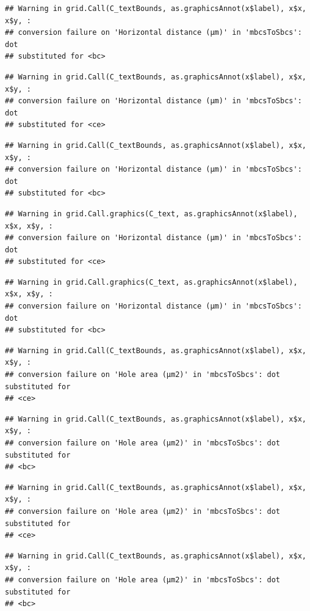 \documentclass[
]{article}
\begin{document}
\begin{verbatim}
## Warning in grid.Call(C_textBounds, as.graphicsAnnot(x$label), x$x, x$y, :
## conversion failure on 'Horizontal distance (μm)' in 'mbcsToSbcs': dot
## substituted for <bc>
\end{verbatim}

\begin{verbatim}
## Warning in grid.Call(C_textBounds, as.graphicsAnnot(x$label), x$x, x$y, :
## conversion failure on 'Horizontal distance (μm)' in 'mbcsToSbcs': dot
## substituted for <ce>
\end{verbatim}

\begin{verbatim}
## Warning in grid.Call(C_textBounds, as.graphicsAnnot(x$label), x$x, x$y, :
## conversion failure on 'Horizontal distance (μm)' in 'mbcsToSbcs': dot
## substituted for <bc>
\end{verbatim}

\begin{verbatim}
## Warning in grid.Call.graphics(C_text, as.graphicsAnnot(x$label), x$x, x$y, :
## conversion failure on 'Horizontal distance (μm)' in 'mbcsToSbcs': dot
## substituted for <ce>
\end{verbatim}

\begin{verbatim}
## Warning in grid.Call.graphics(C_text, as.graphicsAnnot(x$label), x$x, x$y, :
## conversion failure on 'Horizontal distance (μm)' in 'mbcsToSbcs': dot
## substituted for <bc>
\end{verbatim}

\begin{verbatim}
## Warning in grid.Call(C_textBounds, as.graphicsAnnot(x$label), x$x, x$y, :
## conversion failure on 'Hole area (μm2)' in 'mbcsToSbcs': dot substituted for
## <ce>
\end{verbatim}

\begin{verbatim}
## Warning in grid.Call(C_textBounds, as.graphicsAnnot(x$label), x$x, x$y, :
## conversion failure on 'Hole area (μm2)' in 'mbcsToSbcs': dot substituted for
## <bc>
\end{verbatim}

\begin{verbatim}
## Warning in grid.Call(C_textBounds, as.graphicsAnnot(x$label), x$x, x$y, :
## conversion failure on 'Hole area (μm2)' in 'mbcsToSbcs': dot substituted for
## <ce>
\end{verbatim}

\begin{verbatim}
## Warning in grid.Call(C_textBounds, as.graphicsAnnot(x$label), x$x, x$y, :
## conversion failure on 'Hole area (μm2)' in 'mbcsToSbcs': dot substituted for
## <bc>
\end{verbatim}
\end{document}
